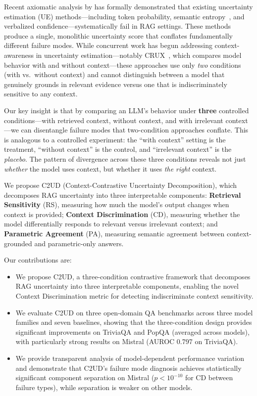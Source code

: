 \documentclass{article}
\newcommand{\ours}{\textsc{C2UD}}
\begin{document}
Recent axiomatic analysis by \citet{soudani2025why} has formally demonstrated that existing uncertainty estimation (UE) methods---including token probability, semantic entropy~\citep{farquhar2024detecting}, and verbalized confidence---systematically fail in RAG settings.
These methods produce a single, monolithic uncertainty score that conflates fundamentally different failure modes.
While concurrent work has begun addressing context-awareness in uncertainty estimation---notably CRUX~\citep{yuan2026crux}, which compares model behavior with and without context---these approaches use only \emph{two} conditions (with vs.\ without context) and cannot distinguish between a model that genuinely grounds in relevant evidence versus one that is indiscriminately sensitive to any context.

Our key insight is that by comparing an LLM's behavior under \textbf{three} controlled conditions---with retrieved context, without context, and with irrelevant context---we can disentangle failure modes that two-condition approaches conflate.
This is analogous to a controlled experiment: the ``with context'' setting is the treatment, ``without context'' is the control, and ``irrelevant context'' is the \emph{placebo}.
The pattern of divergence across these three conditions reveals not just \emph{whether} the model uses context, but whether it uses \emph{the right} context.

We propose \ours{} (Context-Contrastive Uncertainty Decomposition), which decomposes RAG uncertainty into three interpretable components:
\textbf{Retrieval Sensitivity} (RS), measuring how much the model's output changes when context is provided;
\textbf{Context Discrimination} (CD), measuring whether the model differentially responds to relevant versus irrelevant context; and
\textbf{Parametric Agreement} (PA), measuring semantic agreement between context-grounded and parametric-only answers.

Our contributions are:
\begin{itemize}
    \item We propose \ours{}, a three-condition contrastive framework that decomposes RAG uncertainty into three interpretable components, enabling the novel Context Discrimination metric for detecting indiscriminate context sensitivity.
    \item We evaluate \ours{} on three open-domain QA benchmarks across three model families and seven baselines, showing that the three-condition design provides significant improvements on TriviaQA and PopQA (averaged across models), with particularly strong results on Mistral (AUROC 0.797 on TriviaQA).
    \item We provide transparent analysis of model-dependent performance variation and demonstrate that \ours{}'s failure mode diagnosis achieves statistically significant component separation on Mistral ($p < 10^{-10}$ for CD between failure types), while separation is weaker on other models.
\end{itemize}
\end{document}
